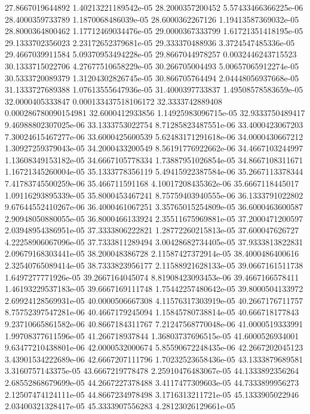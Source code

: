 {27.8667019644892 1.40213221189542e-05
28.2000357200452 5.57433466366225e-06
28.4000359733789 1.1870068486039e-05
28.6000362267126 1.19413587369032e-05
28.8000364800462 1.17712469034476e-05
29.0000367333799 1.61721351418195e-05
29.1333702356023 2.23172652379681e-05
29.333370488936 3.3724547485336e-05
29.4667039911584 5.09370953494228e-05
29.8667044978257 0.0032446243715523
30.1333715022706 4.27677510658229e-05
30.266705004493 5.00657065912274e-05
30.5333720089379 1.31204302826745e-05
30.866705764494 2.04448056937668e-05
31.1333727689388 1.07613555647936e-05
31.4000397733837 1.49508578583659e-05
32.0000405333847 0.000133437518106172
32.3333742889408 0.000286780090154981
32.6000412933856 1.14925983096715e-05
32.9333750489417 9.46988802307025e-06
33.1333753022754 8.71285823487551e-06
33.4000423067203 7.30024615467277e-06
33.6000425600539 5.62483171291618e-06
34.0000430667212 1.30927259379043e-05
34.2000433200549 8.56191776922662e-06
34.4667103244997 1.13608349153182e-05
34.6667105778334 1.73887951026854e-05
34.8667108311671 1.16721345260004e-05
35.1333778356119 5.49415922387584e-06
35.2667113378344 7.41783745500259e-06
35.466711591168 4.10017208435362e-06
35.6667118445017 1.09116293895339e-05
35.8000453467241 8.75759403940555e-06
36.1333791022802 9.67644552410267e-06
36.4000461067251 3.35765015254809e-05
36.6000463600587 2.90948050880055e-05
36.8000466133924 2.35511675969881e-05
37.2000471200597 2.03948954386951e-05
37.3333806222821 1.28772260215813e-05
37.600047626727 4.22258906067096e-05
37.7333811289494 3.00428682734405e-05
37.9333813822831 2.09679168303441e-05
38.200048386728 2.11587427372914e-05
38.4000486400616 2.32540765089414e-05
38.7333823956177 2.11588921628133e-05
39.0667161511738 1.6497277771926e-05
39.2667164045074 8.81908423093453e-06
39.4667166578411 1.46193229537183e-05
39.6667169111748 1.75442257480642e-05
39.8000504133972 2.69924128569931e-05
40.0000506667308 4.11576317303919e-05
40.2667176711757 8.75752397547281e-06
40.4667179245094 1.15845780738814e-05
40.666718177843 9.23710665861582e-06
40.8667184311767 7.21247568770048e-06
41.0000519333991 1.99708377611596e-05
41.266718937844 1.36803737696515e-05
41.6000526934001 9.63477210438801e-06
42.0000532000674 5.85590672248435e-06
42.2667202045123 3.43901534222689e-06
42.6667207111796 1.70232523658436e-05
43.1333879689581 3.3160757143375e-05
43.6667219778478 2.25910476483067e-05
44.1333892356264 2.68552868679699e-05
44.2667227378488 3.4117477309603e-05
44.7333899956273 2.12507474124111e-05
44.8667234978498 3.1716313211721e-05
45.1333905022946 2.03400321328417e-05
45.3333907556283 4.28123026129661e-05
}
